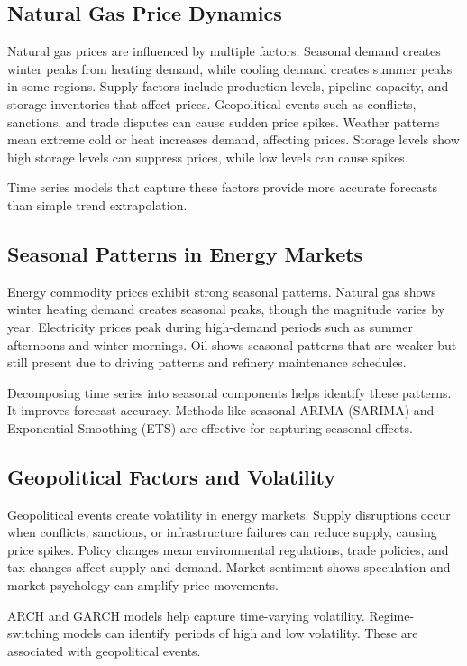 \subsection{Natural Gas Price Dynamics}

Natural gas prices are influenced by multiple factors. Seasonal demand creates winter peaks from heating demand, while cooling demand creates summer peaks in some regions. Supply factors include production levels, pipeline capacity, and storage inventories that affect prices. Geopolitical events such as conflicts, sanctions, and trade disputes can cause sudden price spikes. Weather patterns mean extreme cold or heat increases demand, affecting prices. Storage levels show high storage levels can suppress prices, while low levels can cause spikes.

Time series models that capture these factors provide more accurate forecasts than simple trend extrapolation.

\subsection{Seasonal Patterns in Energy Markets}

Energy commodity prices exhibit strong seasonal patterns. Natural gas shows winter heating demand creates seasonal peaks, though the magnitude varies by year. Electricity prices peak during high-demand periods such as summer afternoons and winter mornings. Oil shows seasonal patterns that are weaker but still present due to driving patterns and refinery maintenance schedules.

Decomposing time series into seasonal components helps identify these patterns. It improves forecast accuracy. Methods like seasonal ARIMA (SARIMA) and Exponential Smoothing (ETS) are effective for capturing seasonal effects.

\subsection{Geopolitical Factors and Volatility}

Geopolitical events create volatility in energy markets. Supply disruptions occur when conflicts, sanctions, or infrastructure failures can reduce supply, causing price spikes. Policy changes mean environmental regulations, trade policies, and tax changes affect supply and demand. Market sentiment shows speculation and market psychology can amplify price movements.

ARCH and GARCH models help capture time-varying volatility. Regime-switching models can identify periods of high and low volatility. These are associated with geopolitical events.


